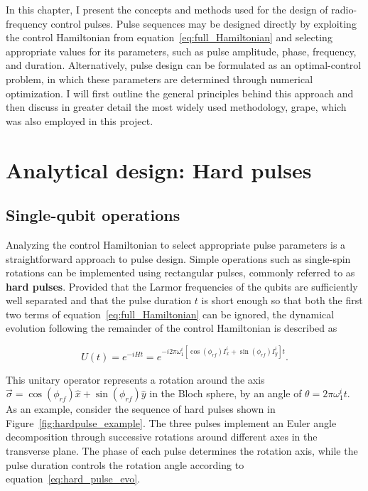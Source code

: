 In this chapter, I present the concepts and methods used for the design of radio-frequency control pulses. Pulse sequences may be designed directly by exploiting the control Hamiltonian from equation~\ref{eq:full_Hamiltonian} and selecting appropriate values for its parameters, such as pulse amplitude, phase, frequency, and duration. Alternatively, pulse design can be formulated as an optimal-control problem, in which these parameters are determined through numerical optimization. I will first outline the general principles behind this approach and then discuss in greater detail the most widely used methodology, \ac{grape}, which was also employed in this project.

\section{Analytical design: Hard pulses}
\label{sec:hard_pulses}

\subsection{Single-qubit operations}
\label{subsec:single_qubit_operations}

Analyzing the control Hamiltonian to select appropriate pulse parameters is a straightforward approach to pulse design. Simple operations such as single-spin rotations can be implemented using rectangular pulses, commonly referred to as \textbf{hard pulses}. Provided that the Larmor frequencies of the qubits are sufficiently well separated and that the pulse duration \(t\) is short enough so that both the first two terms of equation~\ref{eq:full_Hamiltonian} can be ignored, the dynamical evolution following the remainder of the control Hamiltonian is described as

\begin{equation}
    U(t)=e^{-iHt}=e^{-i2\pi\omega_1^i[\cos(\phi_{rf})I_x^i+\sin(\phi_{rf})I_y^i]t}.
    \label{eq:hard_pulse_evo}
\end{equation}

This unitary operator represents a rotation around the axis \(\vec{\sigma}=\cos(\phi_{rf})\hat{x}+\sin(\phi_{rf})\hat{y}\) in the Bloch sphere, by an angle of \(\theta=2\pi\omega_1^i t\). As an example, consider the sequence of hard pulses shown in Figure~\ref{fig:hardpulse_example}. The three pulses implement an Euler angle decomposition through successive rotations around different axes in the transverse plane. The phase of each pulse determines the rotation axis, while the pulse duration controls the rotation angle according to equation~\ref{eq:hard_pulse_evo}.

